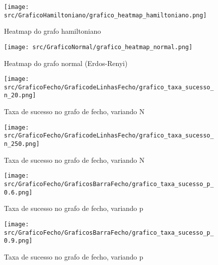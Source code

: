 \documentclass[12pt, openright, oneside, a4paper, chapter=TITLE, section=TITLE, subsection=TITLE, subsubsection=TITLE, brazil]{abntex2}
\begin{document}
\begin{figure}[h]
    \centering
    \texttt{[image: src/GraficoHamiltoniano/grafico\_heatmap\_hamiltoniano.png]}
    \caption{Heatmap do grafo hamiltoniano}
    \label{fig:Heatmap do grafo hamiltoniano}
\end{figure}
\begin{figure}[h]
    \centering
    \texttt{[image: src/GraficoNormal/grafico\_heatmap\_normal.png]}
    \caption{Heatmap do grafo normal (Erdos-Renyi)}
    \label{fig:Heatmap do grafo normal (Erdos-Renyi)}
\end{figure}

\begin{figure}[h]
    \centering
    \begin{minipage}{0.45\textwidth}
        \centering
        \texttt{[image: src/GraficoFecho/GraficodeLinhasFecho/grafico\_taxa\_sucesso\_n\_20.png]}
        \caption{Taxa de sucesso no grafo de fecho, variando N}
        \label{fig:Taxa de sucesso no grafo de fecho, variando N}
    \end{minipage}
    \hfill
    \begin{minipage}{0.45\textwidth}
        \centering
        \texttt{[image: src/GraficoFecho/GraficodeLinhasFecho/grafico\_taxa\_sucesso\_n\_250.png]}
        \caption{Taxa de sucesso no grafo de fecho, variando N}
        \label{fig:Taxa de sucesso no grafo de fecho, variando N250}
        \end{minipage}
\end{figure}

\begin{figure}[h]
    \centering
    \begin{minipage}{0.45\textwidth}
        \centering
        \texttt{[image: src/GraficoFecho/GraficosBarraFecho/grafico\_taxa\_sucesso\_p\_0.6.png]}
        \caption{Taxa de sucesso no grafo de fecho, variando p}
        \label{fig:Taxa de sucesso no grafo de fecho, variando p}
    \end{minipage}
    \hfill
    \begin{minipage}{0.45\textwidth}
        \centering
        \texttt{[image: src/GraficoFecho/GraficosBarraFecho/grafico\_taxa\_sucesso\_p\_0.9.png]}
        \caption{Taxa de sucesso no grafo de fecho, variando p}
        \label{fig:Taxa de sucesso no grafo de fecho, variando p.9}
    \end{minipage}
\end{figure}
\end{document}
